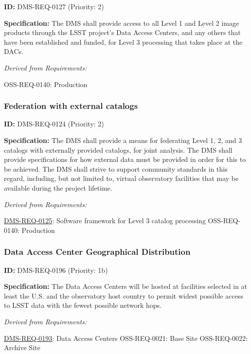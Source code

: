 \documentclass[SE,toc,lsstdraft]{lsstdoc}
\begin{document}
\label{DMS-REQ-0127}
\textbf{ID:} DMS-REQ-0127 (Priority: 2)

\textbf{Specification:} The DMS shall provide access to all Level 1 and Level 2 image products through the LSST project's Data Access Centers, and any others that have been established and funded, for Level 3 processing that takes place at the DACs.

\emph{Derived from Requirements:}

OSS-REQ-0140:
Production \newline

\subsubsection{Federation with external catalogs}

\label{DMS-REQ-0124}
\textbf{ID:} DMS-REQ-0124 (Priority: 2)

\textbf{Specification: }The DMS shall provide a means for federating Level 1, 2, and 3 catalogs with externally provided catalogs, for joint analysis.  The DMS shall provide specifications for how external data must be provided in order for this to be achieved. The DMS shall strive to support community standards in this regard, including, but not limited to, virtual observatory facilities that may be available during the project lifetime.

\emph{Derived from Requirements:}

\hyperref[DMS-REQ-0125]{DMS-REQ-0125}:
Software framework for Level 3 catalog processing \newline
OSS-REQ-0140:
Production \newline

\subsubsection{Data Access Center Geographical Distribution}

\label{DMS-REQ-0196}
\textbf{ID:} DMS-REQ-0196 (Priority: 1b)

\textbf{Specification:} The Data Access Centers will be hosted at facilities selected in at least the U.S. and the observatory host country to permit widest possible access to LSST data with the fewest possible network hops.

\emph{Derived from Requirements:}

\hyperref[DMS-REQ-0193]{DMS-REQ-0193}:
Data Access Centers \newline
OSS-REQ-0021:
Base Site \newline
OSS-REQ-0022:
Archive Site \newline
\end{document}
